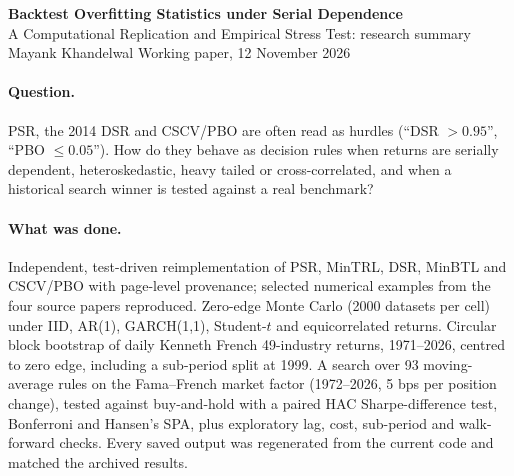 \documentclass[10pt,a4paper]{article}
\begin{document}
\begin{center}
{\large\textbf{Backtest Overfitting Statistics under Serial Dependence}}\\[2pt]
{A Computational Replication and Empirical Stress Test: research summary}\\[2pt]
{\small Mayank Khandelwal \quad Working paper, 12 November 2026}
\end{center}

\paragraph{Question.} PSR, the 2014 DSR and CSCV/PBO are often read as hurdles (``DSR $>0.95$'', ``PBO $\le0.05$''). How do they behave as decision rules when returns are serially dependent, heteroskedastic, heavy tailed or cross-correlated, and when a historical search winner is tested against a real benchmark?

\paragraph{What was done.} Independent, test-driven reimplementation of PSR, MinTRL, DSR, MinBTL and CSCV/PBO with page-level provenance; selected numerical examples from the four source papers reproduced. Zero-edge Monte Carlo (2000 datasets per cell) under IID, AR(1), GARCH(1,1), Student-$t$ and equicorrelated returns. Circular block bootstrap of daily Kenneth French 49-industry returns, 1971--2026, centred to zero edge, including a sub-period split at 1999. A search over 93 moving-average rules on the Fama--French market factor (1972--2026, 5 bps per position change), tested against buy-and-hold with a paired HAC Sharpe-difference test, Bonferroni and Hansen's SPA, plus exploratory lag, cost, sub-period and walk-forward checks. Every saved output was regenerated from the current code and matched the archived results.
\end{document}
